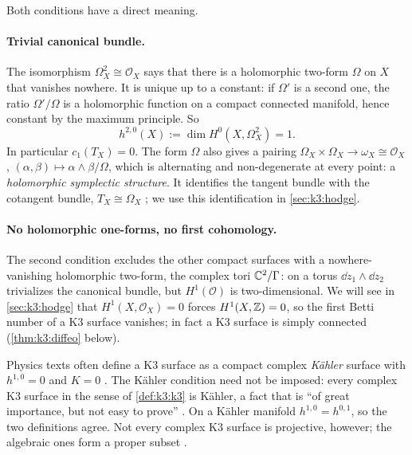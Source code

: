 Both conditions have a direct meaning.

\paragraph{Trivial canonical bundle.} The isomorphism $\Omega_X^2\cong\mathcal{O}_X$ says that
there is a holomorphic two-form $\Omega$ on $X$ that vanishes nowhere. It is unique up to a
constant: if $\Omega'$ is a second one, the ratio $\Omega'/\Omega$ is a holomorphic function on a
compact connected manifold, hence constant by the maximum principle. So
\begin{equation}\label{eq:k3:h20}
  h^{2,0}(X):=\dim H^0(X,\Omega^2_X)=1 .
\end{equation}
 In particular $c_1(T_X)=0$. The form $\Omega$ also gives a
pairing $\Omega_X\times\Omega_X\to\omega_X\cong\mathcal{O}_X$, $(\alpha,\beta)\mapsto
\alpha\wedge\beta/\Omega$, which is alternating and non-degenerate at every point: a
\emph{holomorphic symplectic structure}. It identifies the
tangent bundle with the cotangent bundle, $T_X\cong\Omega_X$ ; we use this identification in \cref{sec:k3:hodge}.

\paragraph{No holomorphic one-forms, no first cohomology.} The second condition excludes the
other compact surfaces with a nowhere-vanishing holomorphic two-form, the complex tori
$\mathbb{C}^2/\Gamma$: on a torus $\dd z_1\wedge\dd z_2$ trivializes the canonical bundle, but
$H^1(\mathcal{O})$ is two-dimensional. We will see in \cref{sec:k3:hodge} that
$H^1(X,\mathcal{O}_X)=0$ forces $H^1(X,\mathbb{Z})=0$, so the first Betti number of a K3 surface
vanishes; in fact a K3 surface is simply connected (\cref{thm:k3:diffeo} below).

\begin{remark}\label{rem:k3:twodefs}
Physics texts often define a K3 surface as a compact complex \emph{Kähler} surface with
$h^{1,0}=0$ and $K=0$ . The Kähler condition need not be imposed: every complex K3 surface in the sense of
\cref{def:k3:k3} is Kähler, a fact that is ``of great importance, but not easy to prove''
. \TL{} On a Kähler manifold $h^{1,0}=h^{0,1}$, so the two
definitions agree. Not every complex K3 surface is projective, however; the algebraic ones form
a proper subset .
\end{remark}

